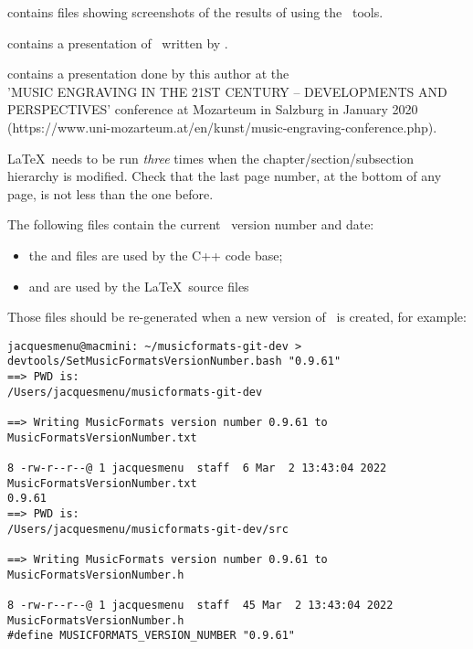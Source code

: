  contains  files showing screenshots of the results of using the \mf\ tools. %

 contains a presentation of \libmusicxml\ written by \fober.

 contains a presentation done by this author at the \\
'MUSIC ENGRAVING IN THE 21ST CENTURY -- DEVELOPMENTS AND PERSPECTIVES' conference at Mozarteum in Salzburg in January 2020 (https://www.uni-mozarteum.at/en/kunst/music-engraving-conference.php).


\LaTeX\ needs to be run {\it three} times when the chapter/section/subsection hierarchy is modified. Check that the last page number, at the bottom of any page, is not less than the one before.

The following files contain the current \mf\ version number and date:
\begin{itemize}
\item the  and  files are used by the C++ code base;
\item {} and  are used by the \LaTeX\ source files
\end{itemize}
Those files should be re-generated when a new version of \mf\ is created, for example:
\begin{lstlisting}[language=Terminal]
jacquesmenu@macmini: ~/musicformats-git-dev > devtools/SetMusicFormatsVersionNumber.bash "0.9.61"
==> PWD is:
/Users/jacquesmenu/musicformats-git-dev

==> Writing MusicFormats version number 0.9.61 to MusicFormatsVersionNumber.txt

8 -rw-r--r--@ 1 jacquesmenu  staff  6 Mar  2 13:43:04 2022 MusicFormatsVersionNumber.txt
0.9.61
==> PWD is:
/Users/jacquesmenu/musicformats-git-dev/src

==> Writing MusicFormats version number 0.9.61 to MusicFormatsVersionNumber.h

8 -rw-r--r--@ 1 jacquesmenu  staff  45 Mar  2 13:43:04 2022 MusicFormatsVersionNumber.h
#define MUSICFORMATS_VERSION_NUMBER "0.9.61"
\end{lstlisting}

